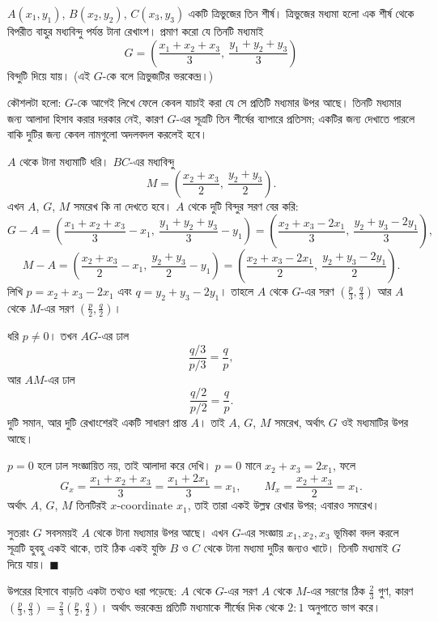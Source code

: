 \documentclass[11pt]{article}
\begin{document}
 $A(x_1, y_1)$, $B(x_2, y_2)$, $C(x_3, y_3)$ একটি ত্রিভুজের তিন
শীর্ষ। ত্রিভুজের মধ্যমা হলো এক শীর্ষ থেকে বিপরীত বাহুর মধ্যবিন্দু পর্যন্ত
টানা রেখাংশ। প্রমাণ করো যে তিনটি মধ্যমাই
\[
  G = \left( \frac{x_1 + x_2 + x_3}{3},\ \frac{y_1 + y_2 + y_3}{3} \right)
\]
বিন্দুটি দিয়ে যায়। (এই $G$-কে বলে ত্রিভুজটির ভরকেন্দ্র।)

\begin{sol}
কৌশলটা হলো: $G$-কে আগেই লিখে ফেলে কেবল যাচাই করা যে সে প্রতিটি মধ্যমার উপর
আছে। তিনটি মধ্যমার জন্য আলাদা হিসাব করার দরকার নেই, কারণ $G$-এর সূত্রটি তিন
শীর্ষের ব্যাপারে প্রতিসম; একটির জন্য দেখাতে পারলে বাকি দুটির জন্য কেবল
নামগুলো অদলবদল করলেই হবে।

$A$ থেকে টানা মধ্যমাটি ধরি। $BC$-এর মধ্যবিন্দু
\[
  M = \left( \frac{x_2 + x_3}{2},\ \frac{y_2 + y_3}{2} \right).
\]
এখন $A$, $G$, $M$ সমরেখ কি না দেখতে হবে। $A$ থেকে দুটি বিন্দুর সরণ বের করি:
\[
  G - A = \left( \frac{x_1+x_2+x_3}{3} - x_1,\ \frac{y_1+y_2+y_3}{3} - y_1 \right)
        = \left( \frac{x_2 + x_3 - 2x_1}{3},\ \frac{y_2 + y_3 - 2y_1}{3} \right),
\]
\[
  M - A = \left( \frac{x_2+x_3}{2} - x_1,\ \frac{y_2+y_3}{2} - y_1 \right)
        = \left( \frac{x_2 + x_3 - 2x_1}{2},\ \frac{y_2 + y_3 - 2y_1}{2} \right).
\]
লিখি $p = x_2 + x_3 - 2x_1$ এবং $q = y_2 + y_3 - 2y_1$। তাহলে $A$ থেকে $G$-এর
সরণ $\left( \tfrac{p}{3}, \tfrac{q}{3} \right)$ আর $A$ থেকে $M$-এর সরণ
$\left( \tfrac{p}{2}, \tfrac{q}{2} \right)$।

ধরি $p \neq 0$। তখন $AG$-এর ঢাল
\[
  \frac{q/3}{p/3} = \frac{q}{p},
\]
আর $AM$-এর ঢাল
\[
  \frac{q/2}{p/2} = \frac{q}{p}.
\]
দুটি সমান, আর দুটি রেখাংশেরই একটি সাধারণ প্রান্ত $A$। তাই $A$, $G$, $M$
সমরেখ, অর্থাৎ $G$ ওই মধ্যমাটির উপর আছে।

$p = 0$ হলে ঢাল সংজ্ঞায়িত নয়, তাই আলাদা করে দেখি। $p = 0$ মানে
$x_2 + x_3 = 2x_1$, ফলে
\[
  G_x = \frac{x_1 + x_2 + x_3}{3} = \frac{x_1 + 2x_1}{3} = x_1,
  \qquad
  M_x = \frac{x_2+x_3}{2} = x_1 .
\]
অর্থাৎ $A$, $G$, $M$ তিনটিরই $x$-coordinate $x_1$, তাই তারা একই উল্লম্ব
রেখার উপর; এবারও সমরেখ।

সুতরাং $G$ সবসময়ই $A$ থেকে টানা মধ্যমার উপর আছে। এখন $G$-এর সংজ্ঞায়
$x_1, x_2, x_3$ ভূমিকা বদল করলে সূত্রটি হুবহু একই থাকে, তাই ঠিক একই যুক্তি
$B$ ও $C$ থেকে টানা মধ্যমা দুটির জন্যও খাটে। তিনটি মধ্যমাই $G$ দিয়ে যায়।
$\blacksquare$

উপরের হিসাবে বাড়তি একটা তথ্যও ধরা পড়েছে: $A$ থেকে $G$-এর সরণ $A$ থেকে
$M$-এর সরণের ঠিক $\tfrac{2}{3}$ গুণ, কারণ
$\left( \tfrac{p}{3}, \tfrac{q}{3} \right) = \tfrac{2}{3}
\left( \tfrac{p}{2}, \tfrac{q}{2} \right)$। অর্থাৎ ভরকেন্দ্র প্রতিটি মধ্যমাকে
শীর্ষের দিক থেকে $2 : 1$ অনুপাতে ভাগ করে।
\end{sol}
\end{document}
